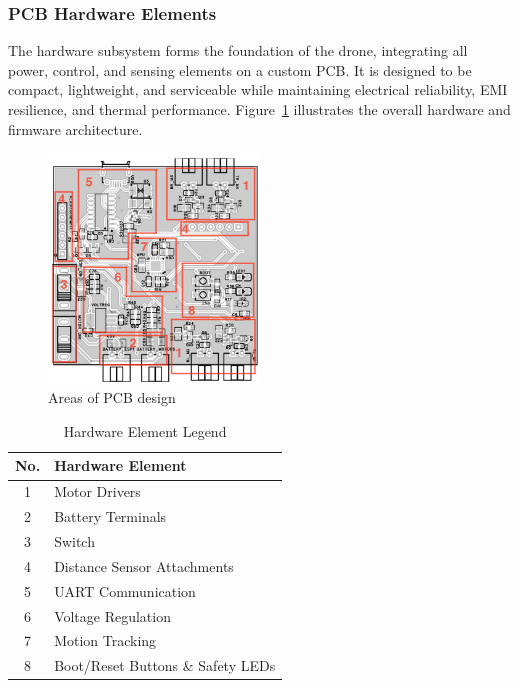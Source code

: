 \subsubsection{PCB Hardware Elements}

The hardware subsystem forms the foundation of the drone, integrating all power, control, and sensing elements on a custom PCB. It is designed to be compact, lightweight, and serviceable while maintaining electrical reliability, EMI resilience, and thermal performance. Figure~\ref{fig:pcb-sections} illustrates the overall hardware and firmware architecture.

\begin{figure}[H]
    \centering
    \captionsetup{justification=centering, margin=1cm}
    \includegraphics[width=0.5\textwidth]{img/pcb-sections2.PNG}
    \caption{Areas of PCB design}
    \label{fig:pcb-sections}
\end{figure}

\begin{table}[h!]
\centering
\caption{Hardware Element Legend}
\label{tab:hardware-legend}
\begin{tabular}{|c|l|}
\hline
\rowcolor{gray!15}\textbf{No.} & \textbf{Hardware Element} \\ \hline
1 & Motor Drivers \\ \hline
2 & Battery Terminals \\ \hline
3 & Switch \\ \hline
4 & Distance Sensor Attachments \\ \hline
5 & UART Communication \\ \hline
6 & Voltage Regulation \\ \hline
7 & Motion Tracking \\ \hline
8 & Boot/Reset Buttons \& Safety LEDs \\ \hline
\end{tabular}
\end{table}

